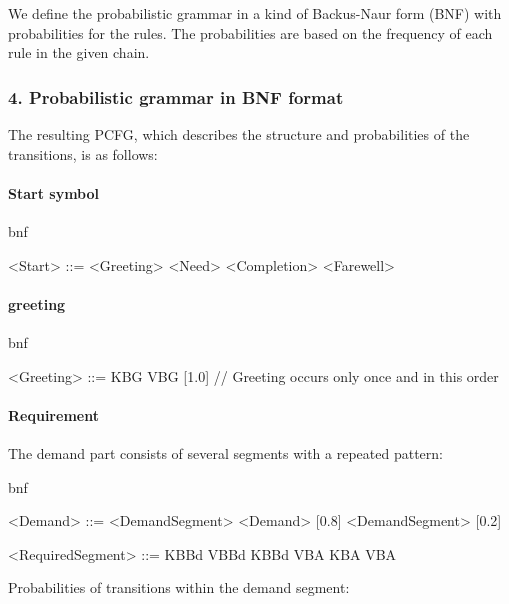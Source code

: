 \documentclass[
]{article}
\begin{document}
We define the probabilistic grammar in a kind of Backus-Naur form (BNF)
with probabilities for the rules. The probabilities are based on the
frequency of each rule in the given chain.

\subsubsection{\texorpdfstring{\textbf{4. Probabilistic grammar in BNF
format}}{4. Probabilistic grammar in BNF format}}\label{probabilistic-grammar-in-bnf-format}

The resulting PCFG, which describes the structure and probabilities of
the transitions, is as follows:

\paragraph{\texorpdfstring{\textbf{Start
symbol}}{Start symbol}}\label{start-symbol}

bnf

\textless Start\textgreater{} ::= \textless Greeting\textgreater{}
\textless Need\textgreater{} \textless Completion\textgreater{}
\textless Farewell\textgreater{}

\paragraph{\texorpdfstring{\textbf{greeting}}{greeting}}\label{greeting}

bnf

\textless Greeting\textgreater{} ::= KBG VBG {[}1.0{]} // Greeting
occurs only once and in this order

\paragraph{\texorpdfstring{\textbf{Requirement}}{Requirement}}\label{requirement}

The demand part consists of several segments with a repeated pattern:

bnf

\textless Demand\textgreater{} ::= \textless DemandSegment\textgreater{}
\textless Demand\textgreater{} {[}0.8{]} \textbar{}
\textless DemandSegment\textgreater{} {[}0.2{]}

\textless RequiredSegment\textgreater{} ::= KBBd VBBd \textbar{} KBBd
VBA \textbar{} KBA VBA

Probabilities of transitions within the demand segment:
\end{document}
